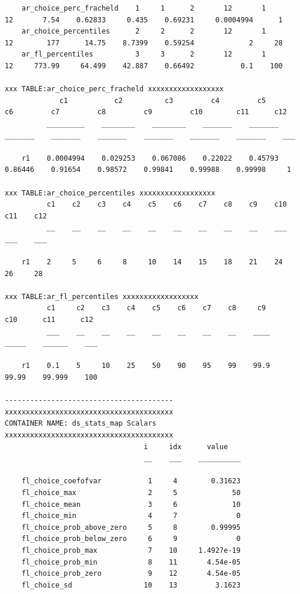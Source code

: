\documentclass[
]{book}
\begin{document}
\begin{verbatim}
    ar_choice_perc_fracheld    1     1      2       12       1       12       7.54    0.62833     0.435    0.69231     0.0004994      1
    ar_choice_percentiles      2     2      2       12       1       12        177      14.75    8.7399    0.59254             2     28
    ar_fl_percentiles          3     3      2       12       1       12     773.99     64.499    42.887    0.66492           0.1    100

xxx TABLE:ar_choice_perc_fracheld xxxxxxxxxxxxxxxxxx
             c1           c2          c3         c4         c5         c6         c7         c8         c9         c10        c11      c12
          _________    ________    ________    _______    _______    _______    _______    _______    _______    _______    _______    ___

    r1    0.0004994    0.029253    0.067086    0.22022    0.45793    0.86446    0.91654    0.98572    0.99841    0.99988    0.99998     1 

xxx TABLE:ar_choice_percentiles xxxxxxxxxxxxxxxxxx
          c1    c2    c3    c4    c5    c6    c7    c8    c9    c10    c11    c12
          __    __    __    __    __    __    __    __    __    ___    ___    ___

    r1    2     5     6     8     10    14    15    18    21    24     26     28 

xxx TABLE:ar_fl_percentiles xxxxxxxxxxxxxxxxxx
          c1     c2    c3    c4    c5    c6    c7    c8     c9      c10      c11      c12
          ___    __    __    __    __    __    __    __    ____    _____    ______    ___

    r1    0.1    5     10    25    50    90    95    99    99.9    99.99    99.999    100

----------------------------------------
xxxxxxxxxxxxxxxxxxxxxxxxxxxxxxxxxxxxxxxx
CONTAINER NAME: ds_stats_map Scalars
xxxxxxxxxxxxxxxxxxxxxxxxxxxxxxxxxxxxxxxx
                                 i     idx      value   
                                 __    ___    __________

    fl_choice_coefofvar           1     4        0.31623
    fl_choice_max                 2     5             50
    fl_choice_mean                3     6             10
    fl_choice_min                 4     7              0
    fl_choice_prob_above_zero     5     8        0.99995
    fl_choice_prob_below_zero     6     9              0
    fl_choice_prob_max            7    10     1.4927e-19
    fl_choice_prob_min            8    11       4.54e-05
    fl_choice_prob_zero           9    12       4.54e-05
    fl_choice_sd                 10    13         3.1623
\end{verbatim}
\end{document}
